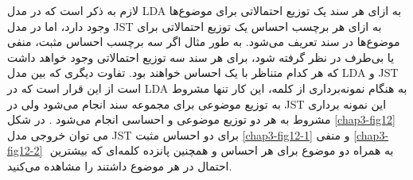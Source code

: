      لازم به ذکر است که در مدل 
     LDA
به ازای هر سند یک توزیع احتمالاتی برای موضوع‌ها وجود دارد، اما در مدل 
     JST
     به ازای هر برچسب احساس یک توزیع احتمالاتی برای موضوع‌ها در سند تعریف می‌شود. به طور مثال اگر سه‌ برچسب احساس مثبت، منفی‌ یا بی‌طرف در نظر گرفته شود، برای هر سند سه‌ توزیع احتمالاتی وجود خواهد داشت که هر کدام متناظر با یک احساس خواهند بود. تفاوت دیگری که بین مدل
LDA
       و
JST
است از این قرار است که در
LDA
  به هنگام نمونه‌برداری از کلمه، این کار تنها مشروط به توزیع موضوعی برای مجموعه سند انجام می‌‌شود ولی‌ در
JST
    این نمونه برداری مشروط به هر دو توزیع موضوعی و احساسی‌ انجام می‌‌شود
    \cite{lin2012weakly}.
    در شکل
    \ref{chap3-fig12}
    می‌ توان خروجی مدل
    JST
    برای دو احساس مثبت 
    \ref{chap3-fig12-1}
    و منفی
    \ref{chap3-fig12-2}
    ‌  به همراه دو موضوع برای هر احساس و همچنین پانزده کلمه‌ای که بیشترین احتمال در هر موضوع داشتند را مشاهده می‌‌کنید.
    
